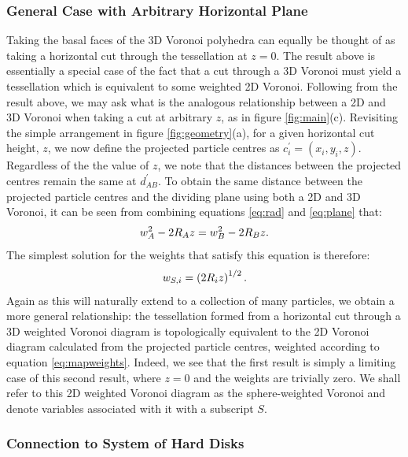 \subsubsection{General Case with Arbitrary Horizontal Plane}

Taking the basal faces of the 3D Voronoi polyhedra can equally be thought of as taking a horizontal cut through the tessellation at $z=0$.
The result above is essentially a special case of the fact that a cut through a 3D Voronoi must yield a tessellation which is equivalent to some weighted 2D Voronoi\cite{Imai1985,Rivier1990}.
Following from the result above, we may ask what is the analogous relationship between a 2D and 3D Voronoi when taking a cut at arbitrary $z$, as in figure \ref{fig:main}(c).
Revisiting the simple arrangement in figure \ref{fig:geometry}(a),
for a given horizontal cut height, $z$, we now define the projected particle centres as $c_i^\prime=\left(x_i,y_i,z\right)$.
Regardless of the the value of $z$, we note that the distances between the projected centres remain the same at $d_{AB}^\prime$.
To obtain the same distance between the projected particle centres and the dividing plane using both a 2D and 3D Voronoi, it can be seen from combining equations \eqref{eq:rad} and \eqref{eq:plane} that:
\begin{equation}
	\label{eq:condition}
	w_A^2-2R_Az = w_B^2-2R_Bz.
\end{equation}
The simplest solution for the weights that satisfy this equation is therefore:
\begin{equation}
	\label{eq:mapweights}
	w_{S,i} = \left(2R_iz\right)^{1/2}.
\end{equation}
Again as this will naturally extend to a collection of many particles, we obtain a more general relationship: the tessellation formed from a horizontal cut through a 3D weighted Voronoi diagram is topologically equivalent to the 2D Voronoi diagram calculated from the projected particle centres, weighted according to equation \eqref{eq:mapweights}.
Indeed, we see that the first result is simply a limiting case of this second result, where $z=0$ and the weights are trivially zero.
We shall refer to this 2D weighted Voronoi diagram as the sphere\--weighted Voronoi and denote variables associated with it with a subscript $S$.

\subsubsection{Connection to System of Hard Disks}

